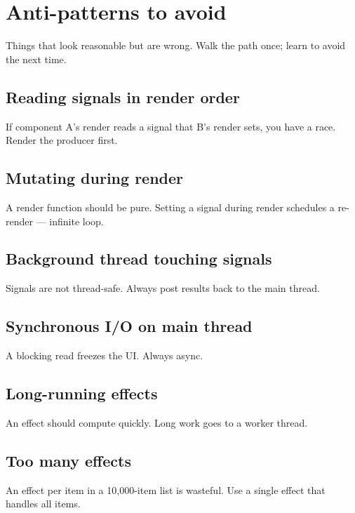 \chapter{Anti-patterns to avoid}
\label{ch:antipatterns}

\begin{aside}
Things that look reasonable but are wrong. Walk the path
once; learn to avoid the next time.
\end{aside}

\section{Reading signals in render order}

If component A's render reads a signal that B's render
sets, you have a race. Render the producer first.

\section{Mutating during render}

A render function should be pure. Setting a signal during
render schedules a re-render --- infinite loop.

\section{Background thread touching signals}

Signals are not thread-safe. Always post results back to
the main thread.

\section{Synchronous I/O on main thread}

A blocking read freezes the UI. Always async.

\section{Long-running effects}

An effect should compute quickly. Long work goes to a
worker thread.

\section{Too many effects}

An effect per item in a 10,000-item list is wasteful. Use
a single effect that handles all items.

